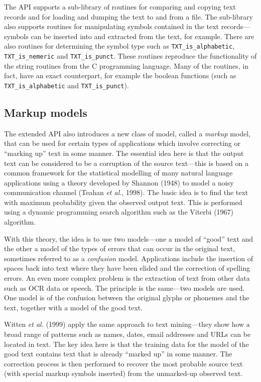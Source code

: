 \documentclass[11pt]{article}
\begin{document}
The API supports a sub-library of routines for comparing and copying text records and for loading and dumping the text
to and from a file. The sub-library also supports routines for manipulating symbols contained in the text
records---symbols can be inserted into and extracted from the text, for example. There are also
routines for determining the symbol type such as \verb|TXT_is_alphabetic|, \verb|TXT_is_nemeric|
and \verb|TXT_is_punct|. These routines reproduce the functionality of the string routines from the C programming
language. Many of the routines, in fact, have an exact counterpart, for example the boolean functions
(such as \verb|TXT_is_alphabetic| and \verb|TXT_is_punct|).

\subsection{Markup models}

The extended API also introduces a new class of model, called a {\em markup}
model, that can be used for certain types of applications which involve
correcting or ``marking up'' text in some manner. The essential idea here is that
the output text can be considered to be a corruption of the source text---this is
based on a common framework for the statistical modelling of many natural language
applications using a theory developed by Shannon (1948) to model a noisy communication
channel (Teahan \emph{et al.}, 1998). The basic idea is to find the text with maximum probability
given the observed output text. This is performed using a dynamic programming search
algorithm such as the Viterbi (1967) algorithm. 

With this theory, the idea is to use two models---one a model of
``good'' text and the other a model of the types of errors that can occur in
the original text, sometimes referred to as a \emph{confusion} model.
Applications include the insertion of spaces back into text where
they have been elided and the correction of
spelling errors. An even more complex problem is the extraction of text from
other data such as OCR data or speech. The
principle is the same---two models are used. One model is of the confusion
between the original glyphs or phonemes and the text, together with a model of
the good text.

Witten {\em et al.} (1999) apply the same approach to text mining---they show
how a broad range of patterns such as names, dates, email addresses and URLs can
be located in text. The key idea here is that the training data for the model of the good text
contains text that is already ``marked up'' in some manner. The correction process
is then performed to recover the most probable source text (with special markup symbols inserted)
from the unmarked-up observed text.
\end{document}
